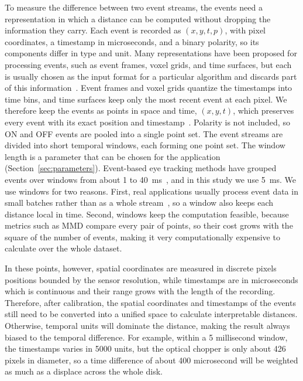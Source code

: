 To measure the difference between two event streams, the events need a representation in which a distance can be computed without dropping the information they carry. Each event is recorded as $(x, y, t, p)$, with pixel coordinates, a timestamp in microseconds, and a binary polarity, so its components differ in type and unit. Many representations have been proposed for processing events, such as event frames, voxel grids, and time surfaces, but each is usually chosen as the input format for a particular algorithm and discards part of this information~\cite{gallego2022event}. Event frames and voxel grids quantize the timestamps into time bins, and time surfaces keep only the most recent event at each pixel. We therefore keep the events as points in space and time, $(x, y, t)$, which preserves every event with its exact position and timestamp~\cite{gallego2022event}. Polarity is not included, so ON and OFF events are pooled into a single point set. The event streams are divided into short temporal windows, each forming one point set. The window length is a parameter that can be chosen for the application (Section~\ref{sec:parameters}). Event-based eye tracking methods have grouped events over windows from about 1 to 40~ms~\cite{bonazzi2024retina,groenen2025gazescrnn,wang2024eyetracking,zhao2023eveye}, and in this study we use 5~ms. We use windows for two reasons. First, real applications usually process event data in small batches rather than as a whole stream~\cite{gallego2022event}, so a window also keeps each distance local in time. Second, windows keep the computation feasible, because metrics such as MMD compare every pair of points, so their cost grows with the square of the number of events, making it very computationally expensive to calculate over the whole dataset.

In these points, however, spatial coordinates are measured in discrete pixels positions bounded by the sensor resolution, while timestamps are in microseconds which is continuous and their range grows with the length of the recording. Therefore, after calibration, the spatial coordinates and timestamps of the events still need to be converted into a unified space to calculate interpretable distances. Otherwise, temporal units will dominate the distance, making the result always biased to the temporal difference. For example, within a 5 millisecond window, the timestamps varies in 5000 units, but the optical chopper is only about 426 pixels in diameter, so a time difference of about 400 microsecond will be weighted as much as a displace across the whole disk. 

